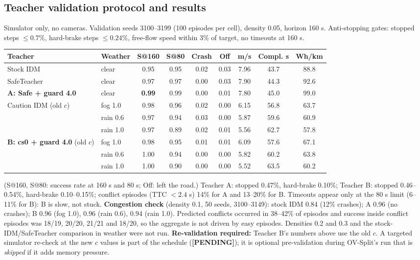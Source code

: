 \documentclass[11pt,a4paper]{article}
\newcommand{\tbd}{\textbf{[PENDING]}}
\begin{document}
\subsection{Teacher validation protocol and results}
Simulator only, no cameras. Validation seeds 3100--3199 (100 episodes per cell), density 0.05, horizon 160 s. Anti-stopping gates: stopped steps $\le0.7\%$, hard-brake steps $\le0.24\%$, free-flow speed within 3\% of target, no timeouts at 160 s.
\begin{center}\footnotesize\setlength{\tabcolsep}{4pt}\begin{tabular}{@{}llccccccc@{}}\toprule
Teacher & Weather & S@160 & S@80 & Crash & Off & m/s & Compl. s & Wh/km\\\midrule
Stock IDM & clear & 0.95 & 0.95 & 0.02 & 0.03 & 7.96 & 43.7 & 88.8\\
SafeTeacher & clear & 0.97 & 0.97 & 0.00 & 0.03 & 7.90 & 44.3 & 92.6\\
\textbf{A: Safe + guard 4.0} & clear & \textbf{0.99} & 0.99 & 0.00 & 0.01 & 7.80 & 45.0 & 99.0\\
Caution IDM (old $c$) & fog 1.0 & 0.98 & 0.96 & 0.02 & 0.00 & 6.15 & 56.8 & 63.7\\
 & rain 0.6 & 0.97 & 0.94 & 0.03 & 0.00 & 5.87 & 59.6 & 60.9\\
 & rain 1.0 & 0.97 & 0.89 & 0.02 & 0.01 & 5.56 & 62.7 & 57.8\\
\textbf{B: cs0 + guard 4.0} (old $c$) & fog 1.0 & 0.98 & 0.95 & 0.01 & 0.01 & 6.09 & 57.6 & 67.1\\
 & rain 0.6 & 1.00 & 0.94 & 0.00 & 0.00 & 5.82 & 60.2 & 63.8\\
 & rain 1.0 & 1.00 & 0.90 & 0.00 & 0.00 & 5.52 & 63.5 & 60.2\\\bottomrule\end{tabular}\end{center}
(S@160, S@80: success rate at 160 s and 80 s; Off: left the road.)
Teacher A: stopped 0.47\%, hard-brake 0.10\%; Teacher B: stopped 0.46--0.54\%, hard-brake 0.10--0.15\%; conflict episodes (TTC $<2.4$ s) 14\% for A and 13--20\% for B. Timeouts appear only at the 80 s limit (6--11\% for B): B is slow, not stuck.
\textbf{Congestion check} (density 0.1, 50 seeds, 3100--3149): stock IDM 0.84 (12\% crashes); A 0.96 (no crashes); B 0.96 (fog 1.0), 0.96 (rain 0.6), 0.94 (rain 1.0). Predicted conflicts occurred in 38--42\% of episodes and success inside conflict episodes was 18/19, 20/20, 21/21 and 18/20, so the aggregate is not driven by easy episodes. Densities 0.2 and 0.3 and the stock-IDM/SafeTeacher comparison in weather were not run.
\textbf{Re-validation required:} Teacher B's numbers above use the old $c$. A targeted simulator re-check at the new $c$ values is part of the schedule (\tbd{}); it is optional pre-validation during OV-Split's run that is \emph{skipped} if it adds memory pressure.
\end{document}

